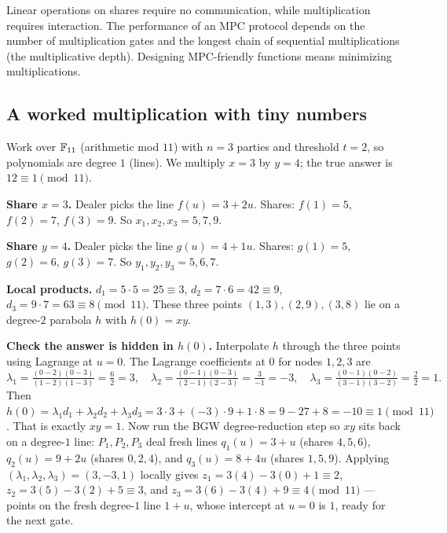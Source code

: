 \begin{focusbox}
Linear operations on shares require no communication, while multiplication requires interaction. The performance of an MPC protocol depends on the number of multiplication gates and the longest chain of sequential multiplications (the multiplicative depth). Designing MPC-friendly functions means minimizing multiplications.
\end{focusbox}

\subsection{A worked multiplication with tiny numbers}

Work over $\mathbb{F}_{11}$ (arithmetic mod $11$) with $n = 3$ parties and threshold $t = 2$, so polynomials are degree $1$ (lines). We multiply $x = 3$ by $y = 4$; the true answer is $12 \equiv 1 \pmod{11}$.

\textbf{Share $x = 3$.} Dealer picks the line $f(u) = 3 + 2u$. Shares: $f(1) = 5$, $f(2) = 7$, $f(3) = 9$. So $x_1, x_2, x_3 = 5, 7, 9$.

\textbf{Share $y = 4$.} Dealer picks the line $g(u) = 4 + 1u$. Shares: $g(1) = 5$, $g(2) = 6$, $g(3) = 7$. So $y_1, y_2, y_3 = 5, 6, 7$.

\textbf{Local products.} $d_1 = 5\cdot 5 = 25 \equiv 3$, $d_2 = 7\cdot 6 = 42 \equiv 9$, $d_3 = 9\cdot 7 = 63 \equiv 8 \pmod{11}$. These three points $(1,3),(2,9),(3,8)$ lie on a degree-$2$ parabola $h$ with $h(0) = xy$.

\textbf{Check the answer is hidden in $h(0)$.} Interpolate $h$ through the three points using Lagrange at $u = 0$. The Lagrange coefficients at $0$ for nodes $1,2,3$ are
\[
\lambda_1 = \tfrac{(0-2)(0-3)}{(1-2)(1-3)} = \tfrac{6}{2} = 3,\quad
\lambda_2 = \tfrac{(0-1)(0-3)}{(2-1)(2-3)} = \tfrac{3}{-1} = -3,\quad
\lambda_3 = \tfrac{(0-1)(0-2)}{(3-1)(3-2)} = \tfrac{2}{2} = 1.
\]
Then $h(0) = \lambda_1 d_1 + \lambda_2 d_2 + \lambda_3 d_3 = 3\cdot 3 + (-3)\cdot 9 + 1\cdot 8 = 9 - 27 + 8 = -10 \equiv 1 \pmod{11}$. That is exactly $xy = 1$. Now run the BGW degree-reduction step so $xy$ sits back on a degree-$1$ line: $P_1, P_2, P_3$ deal fresh lines $q_1(u) = 3 + u$ (shares $4,5,6$), $q_2(u) = 9 + 2u$ (shares $0,2,4$), and $q_3(u) = 8 + 4u$ (shares $1,5,9$). Applying $(\lambda_1, \lambda_2, \lambda_3) = (3, -3, 1)$ locally gives $z_1 = 3(4) - 3(0) + 1 \equiv 2$, $z_2 = 3(5) - 3(2) + 5 \equiv 3$, and $z_3 = 3(6) - 3(4) + 9 \equiv 4 \pmod{11}$ --- points on the fresh degree-$1$ line $1 + u$, whose intercept at $u = 0$ is $1$, ready for the next gate.

